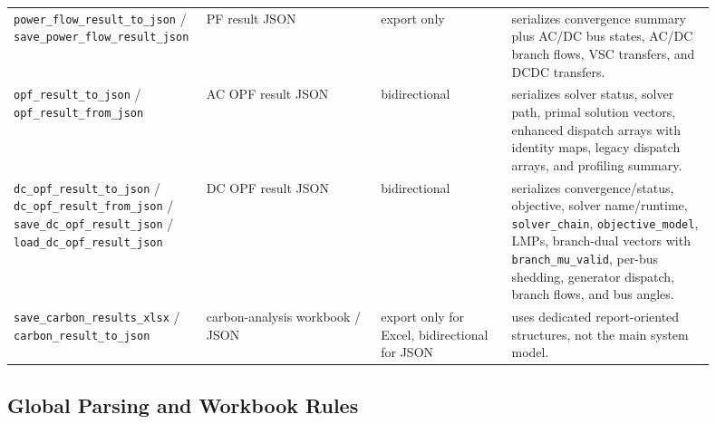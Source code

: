 \begin{longtable}{L{0.20\linewidth}L{0.24\linewidth}L{0.18\linewidth}L{0.28\linewidth}}
\texttt{power\_flow\_result\_to\_json} / \texttt{save\_power\_flow\_result\_json} & PF result JSON & export only & serializes convergence summary plus AC/DC bus states, AC/DC branch flows, VSC transfers, and DCDC transfers. \\
\texttt{opf\_result\_to\_json} / \texttt{opf\_result\_from\_json} & AC OPF result JSON & bidirectional & serializes solver status, solver path, primal solution vectors, enhanced dispatch arrays with identity maps, legacy dispatch arrays, and profiling summary. \\
\texttt{dc\_opf\_result\_to\_json} / \texttt{dc\_opf\_result\_from\_json} / \texttt{save\_dc\_opf\_result\_json} / \texttt{load\_dc\_opf\_result\_json} & DC OPF result JSON & bidirectional & serializes convergence/status, objective, solver name/runtime, \texttt{solver\_chain}, \texttt{objective\_model}, LMPs, branch-dual vectors with \texttt{branch\_mu\_valid}, per-bus shedding, generator dispatch, branch flows, and bus angles. \\
\texttt{save\_carbon\_results\_xlsx} / \texttt{carbon\_result\_to\_json} & carbon-analysis workbook / JSON & export only for Excel, bidirectional for JSON & uses dedicated report-oriented structures, not the main system model. \\
\bottomrule
\end{longtable}

\subsection{Global Parsing and Workbook Rules}

